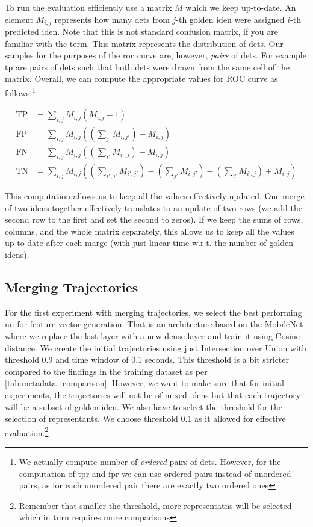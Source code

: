 To run the evaluation efficiently use a matrix $M$ which we keep up-to-date. An element $M_{i,j}$ represents how many \glspl{det} from $j$-th golden \gls{iden} were assigned $i$-th predicted \gls{iden}. Note that this is not standard confusion matrix, if you are familiar with the term. This matrix represents the distribution of \glspl{det}. Our samples for the purposes of the \gls{roc} curve are, however, \emph{pairs} of \glspl{det}. For example \gls{tp} are pairs of \glspl{det} such that both \glspl{det} were drawn from the same cell of the matrix. Overall, we can compute the appropriate values for ROC curve as follows:\footnote{We actually compute number of \emph{ordered} pairs of \glspl{det}. However, for the computation of \gls{tpr} and \gls{fpr} we can use ordered pairs instead of unordered pairs, as for each unordered pair there are exactly two ordered ones}

\begin{align*}
    \mathrm{TP} &= \sum_{i,j} M_{i,j} (M_{i,j} - 1)\\
    \mathrm{FP} &= \sum_{i,j} M_{i,j} \left(\left(\sum_{j'}M_{i,j'}\right)-M_{i,j}\right)\\
    \mathrm{FN} &= \sum_{i,j} M_{i,j} \left(\left(\sum_{i'}M_{i',j}\right)-M_{i,j}\right)\\
    \mathrm{TN} &= \sum_{i,j} M_{i,j} \left(\left(\sum_{i',j'}M_{i',j'}\right) - \left(\sum_{j'}M_{i,j'}\right) - \left(\sum_{i'}M_{i',j}\right) + M_{i,j}\right)
\end{align*}

This computation allows us to keep all the values effectively updated. One merge of two \glspl{iden} together effectively translates to an update of two rows (we add the second row to the first and set the second to zeros). If we keep the sums of rows, columns, and the whole matrix separately, this allows us to keep all the values up-to-date after each marge (with just linear time w.r.t. the number of golden \glspl{iden}).

\subsection{Merging Trajectories}

For the first experiment with merging trajectories, we select the best performing \gls{nn} for feature vector generation. That is an architecture based on the MobileNet where we replace the last layer with a new dense layer and train it using Cosine distance. We create the initial trajectories using just Intersection over Union with threshold 0.9 and time window of 0.1 seconds. This threshold is a bit stricter compared to the findings in the training dataset as per 
\autoref{tab:metadata_comparison}. However, we want to make sure that for initial experiments, the trajectories will not be of mixed \glspl{iden} but that each trajectory will be a subset of golden \gls{iden}. We also have to select the threshold for the selection of representants. We choose threshold 0.1 as it allowed for effective evaluation.\footnote{Remember that smaller the threshold, more representatns will be selected which in turn requires more comparisons}


